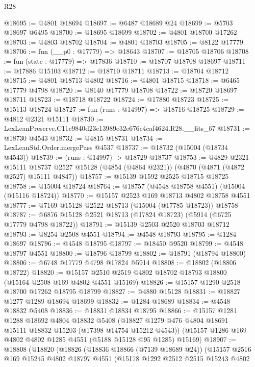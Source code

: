 \begin{lexlean}{R28}
\begin{coremodule}
@18695 := @4801 @18694
@18697 := @6487 @18689 @24
@18699 := @5703 @18697 @6495
@18700 := @18695 @18699
@18702 := @4801 @18700 @17262
@18703 := @4803 @18702
@18704 := @4801 @18703
@18705 := @8122 @17779
@18706 := fun (__p0 : @17779) => @18643
@18707 := @18705 @18706
@18708 := fun (state : @17779) => @17836
@18710 := @18707 @18708 @18697
@18711 := @17886 @15103
@18712 := @18710 @18711
@18713 := @18704 @18712
@18715 := @4801 @18713 @4802
@18716 := @4801 @18715
@18718 := @6465 @17779 @4798
@18720 := @8140 @17779 @18708
@18722 := @18720 @18697 @18711
@18723 := @18718 @18722
@18724 := @17880 @18723
@18725 := @15113 @18724
@18727 := fun (runs : @14997) => @18716 @18725
@18729 := @4812 @2321 @15111
@18730 := LexLeanPreserve.C11e9840d23e13989e32e676c4caf4624.R28.__fits_67
@18731 := @18730 @4543
@18732 := @4815 @18731
@18734 := LexLeanStd.Order.mergePass @4537
@18737 := @18732 (@15004 (@18734 @4543))
@18739 := (runs : @14997) -> @18729 @18737
@18753 := @4829
    @2321
    @15111
    @18737
    @2527
    @15128
    (@4854 (@4864 @2321))
    (@4870 (@4871 (@4872 @2527) @15111 @4847))
@18757 := @15139 @1592 @2525 @18715 @18725
@18758 := @15004 @18724
@18764 := @18757 (@4548 @18758 @4551) (@15004 (@15116 @18724))
@18770 := @15157 @2523 @169 @18713 @4802 @18758 @4551
@18777 := @7169 @15128 @2522 @18713 (@15004 (@17785 @18723)) @18758
@18787 := @6876 @15128 @2521 @18713 (@17824 @18723) (@5914 (@6725 @17779 @4798 @18722))
@18791 := @15139 @2503 @2520 @18703 @18712
@18793 := @8254 @2508 @4551
@18794 := @4548 @18793
@18795 := @1284 @18697
@18796 := @4548 @18795
@18797 := @18450 @9520
@18799 := @4548 @18797 @4551
@18800 := @18796 @18799
@18802 := @18791 (@18794 @18800)
@18806 := @6748 @17779 @4798 @17824 @5914
@18808 := @18802 (@18806 @18722)
@18820 := @15157 @2510 @2519 @4802 @18702 @18793 @18800 (@15164 @2508 @169 @4802 @4551 @15169)
@18826 := @15157 @1290 @2518 @18700 @17262 @18795 @18799
@18827 := @4880 @15128
@18831 := @18827 @1277 @1289 @18694 @18699
@18832 := @1284 @18689
@18834 := @4548 @18832 @5408
@18836 := @18831 @18834 @18795
@18866 := @15157
    @1281
    @1288
    @18692
    @4804
    @18832
    @5408
    (@18827 @1279 @476 @4804 @18691 @15111 @18832 @15203 (@17398 @14754 @15212 @4543))
    (@15157 @1286 @169 @4802 @4802 @1285 @4551 (@5188 @15128 @95 @1285) @15169)
@18907 := @18808
    (@18820
      (@18826
        (@18836 @18866 (@7139 @18689 @24))
        (@15157
          @2516
          @169
          @15245
          @4802
          @18797
          @4551
          (@15178
            @1292
            @2512
            @2515
            @15243
            @4802

\end{coremodule}
\end{lexlean}

